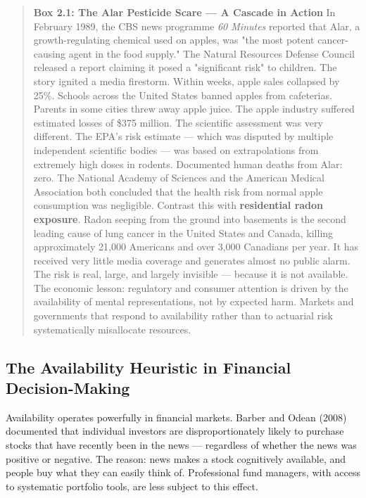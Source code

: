 \documentclass[12pt, letterpaper]{article}
\begin{document}
\begin{quote}
\textbf{Box 2.1: The Alar Pesticide Scare --- A Cascade in Action}
In February 1989, the CBS news programme \textit{60 Minutes} reported that Alar, a growth-regulating chemical used on apples, was "the most potent cancer-causing agent in the food supply." The Natural Resources Defense Council released a report claiming it posed a "significant risk" to children.
The story ignited a media firestorm. Within weeks, apple sales collapsed by 25\%. Schools across the United States banned apples from cafeterias. Parents in some cities threw away apple juice. The apple industry suffered estimated losses of \$375 million.
The scientific assessment was very different. The EPA's risk estimate --- which was disputed by multiple independent scientific bodies --- was based on extrapolations from extremely high doses in rodents. Documented human deaths from Alar: zero. The National Academy of Sciences and the American Medical Association both concluded that the health risk from normal apple consumption was negligible.
Contrast this with \textbf{residential radon exposure}. Radon seeping from the ground into basements is the second leading cause of lung cancer in the United States and Canada, killing approximately 21,000 Americans and over 3,000 Canadians per year. It has received very little media coverage and generates almost no public alarm. The risk is real, large, and largely invisible --- because it is not available.
The economic lesson: regulatory and consumer attention is driven by the availability of mental representations, not by expected harm. Markets and governments that respond to availability rather than to actuarial risk systematically misallocate resources.
\end{quote}

\medskip


\subsection{The Availability Heuristic in Financial Decision-Making}


Availability operates powerfully in financial markets. Barber and Odean (2008) documented that individual investors are disproportionately likely to purchase stocks that have recently been in the news --- regardless of whether the news was positive or negative. The reason: news makes a stock cognitively available, and people buy what they can easily think of. Professional fund managers, with access to systematic portfolio tools, are less subject to this effect.
\end{document}
